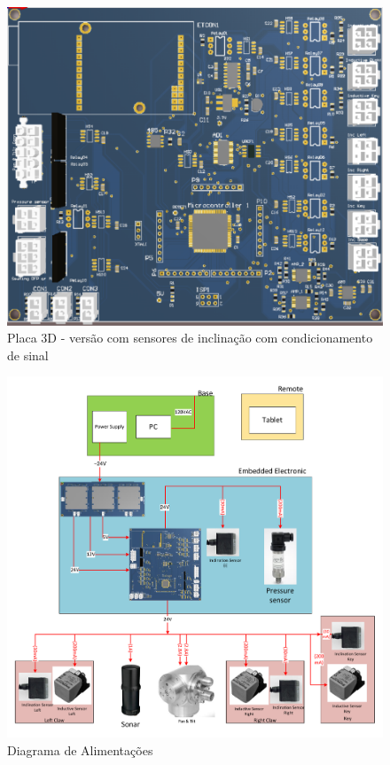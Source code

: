 \begin{figure}[H]
\centering
\includegraphics[width=1\columnwidth]{figs/eletronica/placav22.png}
\caption{Placa 3D - versão com sensores de inclinação com condicionamento de
sinal}
\label{placav22}
\end{figure}

\begin{figure}[H]
\centering
\includegraphics[width=1\columnwidth]{figs/eletronica/alimentacao_placav2.pdf}
\caption{Diagrama de Alimentações}
\label{alimentacao_placav2}
\end{figure}

